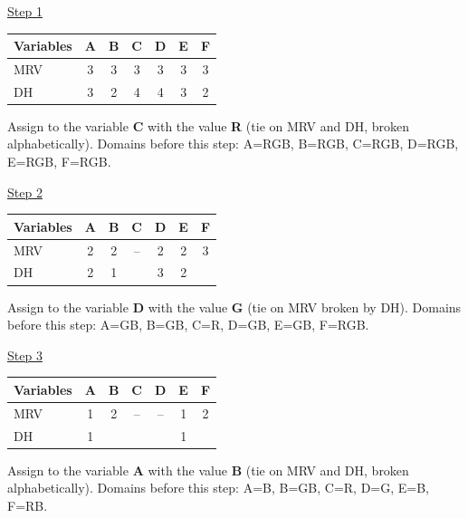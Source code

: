 \documentclass[11pt,a4paper]{article}
\begin{document}
\begin{solbox}
\par \underline{Step 1}\par\begin{center}\small \begin{tabular}{|l|c|c|c|c|c|c|}\hline Variables & \textbf{A} & \textbf{B} & \textbf{C} & \textbf{D} & \textbf{E} & \textbf{F}\\ \hline MRV & \textcolor{blue!60!black}{3} & \textcolor{blue!60!black}{3} & \textcolor{blue!60!black}{3} & \textcolor{blue!60!black}{3} & \textcolor{blue!60!black}{3} & \textcolor{blue!60!black}{3}\\ \hline DH & \textcolor{blue!60!black}{3} & \textcolor{blue!60!black}{2} & \textcolor{blue!60!black}{4} & \textcolor{blue!60!black}{4} & \textcolor{blue!60!black}{3} & \textcolor{blue!60!black}{2}\\ \hline\end{tabular}\end{center}Assign to the variable \textbf{C} with the value \textbf{R} (tie on MRV and DH, broken alphabetically). Domains before this step: A=RGB, B=RGB, C=RGB, D=RGB, E=RGB, F=RGB.\par
\underline{Step 2}\par\begin{center}\small \begin{tabular}{|l|c|c|c|c|c|c|}\hline Variables & \textbf{A} & \textbf{B} & \textbf{C} & \textbf{D} & \textbf{E} & \textbf{F}\\ \hline MRV & \textcolor{blue!60!black}{2} & \textcolor{blue!60!black}{2} & -- & \textcolor{blue!60!black}{2} & \textcolor{blue!60!black}{2} & \textcolor{blue!60!black}{3}\\ \hline DH & \textcolor{blue!60!black}{2} & \textcolor{blue!60!black}{1} &  & \textcolor{blue!60!black}{3} & \textcolor{blue!60!black}{2} & \\ \hline\end{tabular}\end{center}Assign to the variable \textbf{D} with the value \textbf{G} (tie on MRV broken by DH). Domains before this step: A=GB, B=GB, C=R, D=GB, E=GB, F=RGB.\par
\underline{Step 3}\par\begin{center}\small \begin{tabular}{|l|c|c|c|c|c|c|}\hline Variables & \textbf{A} & \textbf{B} & \textbf{C} & \textbf{D} & \textbf{E} & \textbf{F}\\ \hline MRV & \textcolor{blue!60!black}{1} & \textcolor{blue!60!black}{2} & -- & -- & \textcolor{blue!60!black}{1} & \textcolor{blue!60!black}{2}\\ \hline DH & \textcolor{blue!60!black}{1} &  &  &  & \textcolor{blue!60!black}{1} & \\ \hline\end{tabular}\end{center}Assign to the variable \textbf{A} with the value \textbf{B} (tie on MRV and DH, broken alphabetically). Domains before this step: A=B, B=GB, C=R, D=G, E=B, F=RB.\par

\end{solbox}
\end{document}
